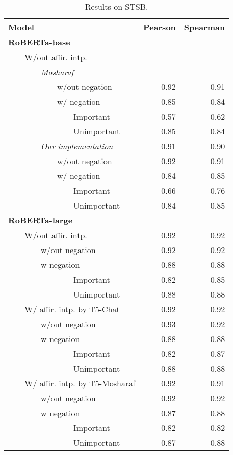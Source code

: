 
\begin{table*}
\centering
\begin{tabular}{lrr}
\toprule
Model & Pearson & Spearman \\
\midrule
\textbf{RoBERTa-base} \\
~~~~W/out affir. intp. \\
~~~~~~~~\textit{Mosharaf} \\
~~~~~~~~~~~~w/out negation &0.92&0.91\\ 
~~~~~~~~~~~~w/ negation &0.85&0.84\\ 
~~~~~~~~~~~~~~~~Important &0.57&0.62\\ 
~~~~~~~~~~~~~~~~Unimportant &0.85&0.84\\ 
\midrule
~~~~~~~~\textit{Our implementation}  & 0.91 & 0.90  \\ 
~~~~~~~~~~~~w/out negation  & 0.92 & 0.91   \\ 
~~~~~~~~~~~~w/ negation  & 0.84 & 0.85  \\
~~~~~~~~~~~~~~~~Important  & 0.66 & 0.76  \\
~~~~~~~~~~~~~~~~Unimportant  & 0.84 & 0.85  \\  
\bottomrule
\textbf{RoBERTa-large} \\
~~~~W/out affir. intp.  & 0.92 & 0.92\\
~~~~~~~~w/out negation  & 0.92 & 0.92 \\ 
~~~~~~~~w negation  & 0.88 & 0.88\\ 
~~~~~~~~~~~~~~~~Important  & 0.82 & 0.85\\ 
~~~~~~~~~~~~~~~~Unimportant  & 0.88 & 0.88\\ 
\midrule
~~~~W/ affir. intp. by T5-Chat  & 0.92 & 0.92 \\
~~~~~~~~w/out negation   & 0.93 & 0.92 \\ 
~~~~~~~~w negation  & 0.88 & 0.88\\ 
~~~~~~~~~~~~~~~~Important  & 0.82 & 0.87\\ 
~~~~~~~~~~~~~~~~Unimportant  & 0.88 & 0.88\\ 
\midrule
~~~~W/ affir. intp. by T5-Mosharaf & 0.92 & 0.91\\
~~~~~~~~w/out negation  & 0.92 & 0.92 \\ 
~~~~~~~~w negation  & 0.87 & 0.88 \\ 
~~~~~~~~~~~~~~~~Important & 0.82 & 0.82 \\ 
~~~~~~~~~~~~~~~~Unimportant & 0.87 & 0.88 \\ 
\bottomrule
\end{tabular}
\caption{Results on STSB.}
\end{table*}